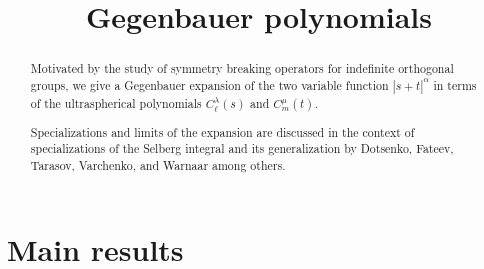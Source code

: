 \documentclass[12pt]{article}
\title{Gegenbauer polynomials}
\numberwithin{equation}{section}
\newcommand{\mygrammarfootnote}[1]{}
\begin{document}
\maketitle

\begin{abstract}
  Motivated by the study of symmetry breaking operators for indefinite
  orthogonal groups, we give a Gegenbauer expansion of the two variable
  function $| s + t |^{\alpha}$ in terms of the ultraspherical polynomials
  $C_{\ell}^{\lambda} (s)$ and $C^{\mu}_m (t)$.
  
  Specializations and limits of the expansion are discussed in the context of
  specializations of the Selberg integral and its
  generalization\mygrammarfootnote{maybe, ``generalization'' should be in plural (i.e.
  ``generalizations'')?} by Dotsenko, Fateev, Tarasov, Varchenko, and Warnaar
  among others.
\end{abstract}

\section{Main results}
\end{document}
